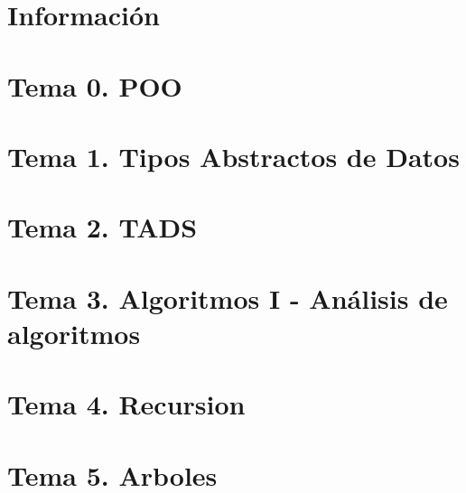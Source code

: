 \documentclass[12pt, twoside, openright]{report} %
\begin{document}



	
\part{Información}



\part{Tema 0. POO}





\part{Tema 1. Tipos Abstractos de Datos}


\part{Tema 2. TADS}






\part{Tema 3. Algoritmos I - Análisis  de algoritmos}


\part{Tema 4. Recursion}


\part{Tema 5. Arboles}



\end{document}
